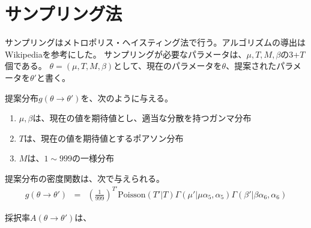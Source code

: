 \documentclass{jsarticle}
\newcommand{\numput}{T}
\newcommand{\maisu}{M}
\newcommand{\poisson}{\mathrm{Poisson}}
\newcommand{\meannumput}{\mu}
\newcommand{\ampeq}{&=&}
\newcommand{\weightvar}{\beta}
\begin{document}
\section{サンプリング法}
サンプリングはメトロポリス・ヘイスティング法で行う。アルゴリズムの導出はWikipediaを参考にした。
サンプリングが必要なパラメータは、$\meannumput, \numput, \maisu, \weightvar$の3+$\numput$個である。
$\theta = (\meannumput, \numput, \maisu, \weightvar)$として、現在のパラメータを$\theta$、提案されたパラメータを$\theta'$と書く。

提案分布$g(\theta\rightarrow\theta')$を、次のように与える。
\begin{enumerate}
 \item $\meannumput, \weightvar$は、現在の値を期待値とし、適当な分散を持つガンマ分布
 \item $\numput$は、現在の値を期待値とするポアソン分布
 \item $\maisu$は、$1\sim 999$の一様分布
\end{enumerate}

提案分布の密度関数は、次で与えられる。
\begin{eqnarray*}
 g(\theta\rightarrow\theta') \ampeq \left(\frac{1}{999}\right)^{\numput'} \poisson(\numput' | \numput) \Gamma(\meannumput' | \meannumput \alpha_{5}, \alpha_{5}) \Gamma(\weightvar' | \weightvar \alpha_{6}, \alpha_{6})
\end{eqnarray*}

採択率$A(\theta\rightarrow\theta')$は、
\begin{eqnarray*}
 
\end{eqnarray*}
\end{document}
